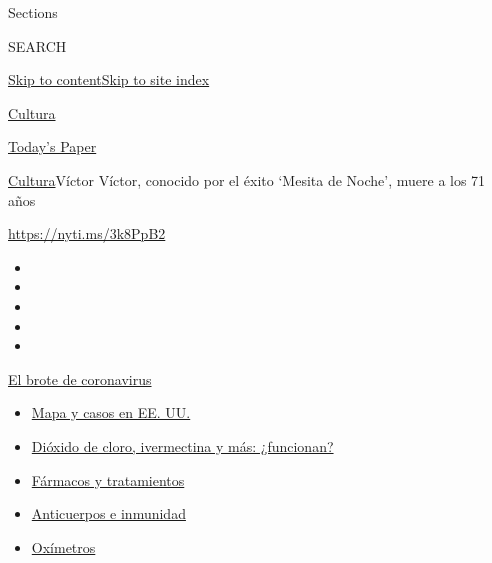 Sections

SEARCH

\protect\hyperlink{site-content}{Skip to
content}\protect\hyperlink{site-index}{Skip to site index}

\href{https://www.nytimes.com/es/section/cultura}{Cultura}

\href{https://myaccount.nytimes.com/auth/login?response_type=cookie\&client_id=vi}{}

\href{https://www.nytimes.com/section/todayspaper}{Today's Paper}

\href{/es/section/cultura}{Cultura}\textbar{}Víctor Víctor, conocido por
el éxito `Mesita de Noche', muere a los 71 años

\url{https://nyti.ms/3k8PpB2}

\begin{itemize}
\item
\item
\item
\item
\item
\end{itemize}

\href{https://www.nytimes.com/es/spotlight/coronavirus?action=click\&pgtype=Article\&state=default\&region=TOP_BANNER\&context=storylines_menu}{El
brote de coronavirus}

\begin{itemize}
\tightlist
\item
  \href{https://www.nytimes.com/es/interactive/2020/espanol/mundo/coronavirus-en-estados-unidos.html?action=click\&pgtype=Article\&state=default\&region=TOP_BANNER\&context=storylines_menu}{Mapa
  y casos en EE. UU.}
\item
  \href{https://www.nytimes.com/es/2020/07/23/espanol/america-latina/bolivia-cloro-coronavirus-ivermectina.html?action=click\&pgtype=Article\&state=default\&region=TOP_BANNER\&context=storylines_menu}{Dióxido
  de cloro, ivermectina y más: ¿funcionan?}
\item
  \href{https://www.nytimes.com/es/interactive/2020/science/coronavirus-tratamientos-curas.html?action=click\&pgtype=Article\&state=default\&region=TOP_BANNER\&context=storylines_menu}{Fármacos
  y tratamientos}
\item
  \href{https://www.nytimes.com/es/2020/07/28/espanol/ciencia-y-tecnologia/anticuerpos-coronavirus-inmunidad.html?action=click\&pgtype=Article\&state=default\&region=TOP_BANNER\&context=storylines_menu}{Anticuerpos
  e inmunidad}
\item
  \href{https://www.nytimes.com/es/2020/04/29/espanol/estilos-de-vida/oximetro-para-que-sirve.html?action=click\&pgtype=Article\&state=default\&region=TOP_BANNER\&context=storylines_menu}{Oxímetros}
\end{itemize}

